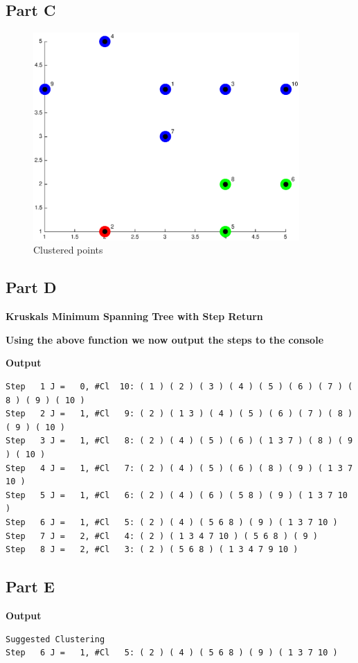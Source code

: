 \documentclass{article}
\begin{document}
\subsection*{Part C}

\begin{figure}[H]
\centering
\includegraphics[width=4in]{ass2Code/1c.eps}
\caption{Clustered points}
\end{figure}
\pagebreak
\subsection*{Part D}
\textbf{Kruskals Minimum Spanning Tree with Step Return}

\textbf{Using the above function we now output the steps to the console}

\pagebreak
\textbf{Output}
\begin{lstlisting}
Step   1 J =   0, #Cl  10: ( 1 ) ( 2 ) ( 3 ) ( 4 ) ( 5 ) ( 6 ) ( 7 ) ( 8 ) ( 9 ) ( 10 )
Step   2 J =   1, #Cl   9: ( 2 ) ( 1 3 ) ( 4 ) ( 5 ) ( 6 ) ( 7 ) ( 8 ) ( 9 ) ( 10 )
Step   3 J =   1, #Cl   8: ( 2 ) ( 4 ) ( 5 ) ( 6 ) ( 1 3 7 ) ( 8 ) ( 9 ) ( 10 )
Step   4 J =   1, #Cl   7: ( 2 ) ( 4 ) ( 5 ) ( 6 ) ( 8 ) ( 9 ) ( 1 3 7 10 )
Step   5 J =   1, #Cl   6: ( 2 ) ( 4 ) ( 6 ) ( 5 8 ) ( 9 ) ( 1 3 7 10 )
Step   6 J =   1, #Cl   5: ( 2 ) ( 4 ) ( 5 6 8 ) ( 9 ) ( 1 3 7 10 )
Step   7 J =   2, #Cl   4: ( 2 ) ( 1 3 4 7 10 ) ( 5 6 8 ) ( 9 )
Step   8 J =   2, #Cl   3: ( 2 ) ( 5 6 8 ) ( 1 3 4 7 9 10 )
\end{lstlisting}

\subsection*{Part E}

\textbf{Output}
\begin{lstlisting}
Suggested Clustering
Step   6 J =   1, #Cl   5: ( 2 ) ( 4 ) ( 5 6 8 ) ( 9 ) ( 1 3 7 10 )
\end{lstlisting}
\end{document}
